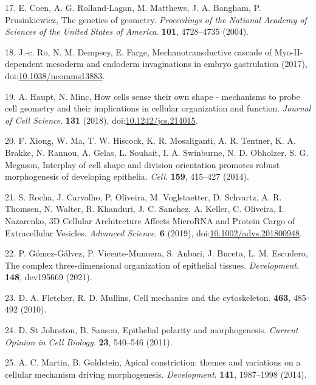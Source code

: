 \documentclass[11pt,singlespacinge,twoside]{reedthesis} %
\theoremstyle{definition}
\theoremstyle{definition}
\theoremstyle{definition}
\theoremstyle{remark}
\begin{document}
\leavevmode\hypertarget{ref-Coen2004}{}%
17. E. Coen, A. G. Rolland-Lagan, M. Matthews, J. A. Bangham, P. Prusinkiewicz, The genetics of geometry. \emph{Proceedings of the National Academy of Sciences of the United States of America}. \textbf{101}, 4728--4735 (2004).

\leavevmode\hypertarget{ref-Ro2017}{}%
18. J.-c. Ro, N. M. Dempsey, E. Farge, Mechanotransductive cascade of Myo-II-dependent mesoderm and endoderm invaginations in embryo gastrulation (2017), doi:\href{https://doi.org/10.1038/ncomms13883}{10.1038/ncomms13883}.

\leavevmode\hypertarget{ref-Haupt2018}{}%
19. A. Haupt, N. Minc, How cells sense their own shape - mechanisms to probe cell geometry and their implications in cellular organization and function. \emph{Journal of Cell Science}. \textbf{131} (2018), doi:\href{https://doi.org/10.1242/jcs.214015}{10.1242/jcs.214015}.

\leavevmode\hypertarget{ref-Xiong2014}{}%
20. F. Xiong, W. Ma, T. W. Hiscock, K. R. Mosaliganti, A. R. Tentner, K. A. Brakke, N. Rannou, A. Gelas, L. Souhait, I. A. Swinburne, N. D. Obholzer, S. G. Megason, Interplay of cell shape and division orientation promotes robust morphogenesis of developing epithelia. \emph{Cell}. \textbf{159}, 415--427 (2014).

\leavevmode\hypertarget{ref-Rocha2019}{}%
21. S. Rocha, J. Carvalho, P. Oliveira, M. Voglstaetter, D. Schvartz, A. R. Thomsen, N. Walter, R. Khanduri, J. C. Sanchez, A. Keller, C. Oliveira, I. Nazarenko, 3D Cellular Architecture Affects MicroRNA and Protein Cargo of Extracellular Vesicles. \emph{Advanced Science}. \textbf{6} (2019), doi:\href{https://doi.org/10.1002/advs.201800948}{10.1002/advs.201800948}.

\leavevmode\hypertarget{ref-Gomez-Galvez2021}{}%
22. P. Gómez-Gálvez, P. Vicente-Munuera, S. Anbari, J. Buceta, L. M. Escudero, The complex three-dimensional organization of epithelial tissues. \emph{Development}. \textbf{148}, dev195669 (2021).

\leavevmode\hypertarget{ref-Fletcher2010}{}%
23. D. A. Fletcher, R. D. Mullins, Cell mechanics and the cytoskeleton. \textbf{463}, 485--492 (2010).

\leavevmode\hypertarget{ref-StJohnston2011}{}%
24. D. St Johnston, B. Sanson, Epithelial polarity and morphogenesis. \emph{Current Opinion in Cell Biology}. \textbf{23}, 540--546 (2011).

\leavevmode\hypertarget{ref-Martin2014}{}%
25. A. C. Martin, B. Goldstein, Apical constriction: themes and variations on a cellular mechanism driving morphogenesis. \emph{Development}. \textbf{141}, 1987--1998 (2014).
\end{document}
